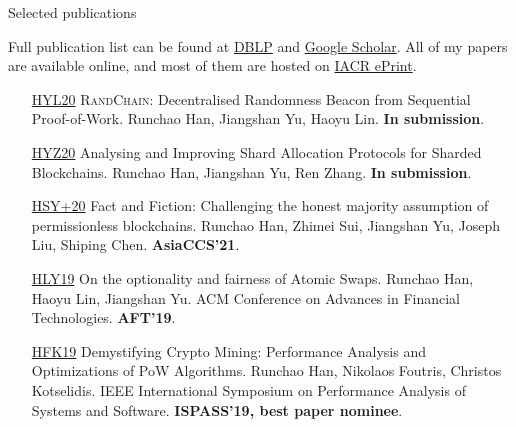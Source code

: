 \documentclass{resume} %
\begin{document}


\begin{rSection}{Selected publications}

    Full publication list can be found at \href{https://dblp.org/pers/hd/h/Han:Runchao}{DBLP} and \href{http://scholar.google.com/citations?user=xbpDocQAAAAJ&hl=en}{Google Scholar}.
    All of my papers are available online, and most of them are hosted on \href{https://eprint.iacr.org/}{IACR ePrint}.

    \begin{itemize}
        \item[\href{https://eprint.iacr.org/2020/1033}{HYL20}] \textsc{RandChain}: Decentralised Randomness Beacon from Sequential Proof-of-Work. Runchao Han, Jiangshan Yu, Haoyu Lin. \textbf{In submission}.
        \item[\href{https://eprint.iacr.org/2020/943}{HYZ20}] Analysing and Improving Shard Allocation Protocols for Sharded Blockchains. Runchao Han, Jiangshan Yu, Ren Zhang. \textbf{In submission}.
        \item[\href{https://eprint.iacr.org/2019/752}{HSY+20}] Fact and Fiction: Challenging the honest majority assumption of permissionless blockchains. Runchao Han, Zhimei Sui, Jiangshan Yu, Joseph Liu, Shiping Chen.  \textbf{AsiaCCS'21}.
        \item[\href{https://eprint.iacr.org/2019/896}{HLY19}] On the optionality and fairness of Atomic Swaps. Runchao Han, Haoyu Lin, Jiangshan Yu.  ACM Conference on Advances in Financial Technologies. \textbf{AFT'19}.
        \item[\href{https://www.research.manchester.ac.uk/portal/files/85753741/paper.pdf}{HFK19}] Demystifying Crypto Mining: Performance Analysis and Optimizations of PoW Algorithms. Runchao Han, Nikolaos Foutris, Christos Kotselidis. IEEE International Symposium on Performance Analysis of Systems and Software. \textbf{ISPASS'19, best paper nominee}.
    \end{itemize}

\end{rSection}
\end{document}
